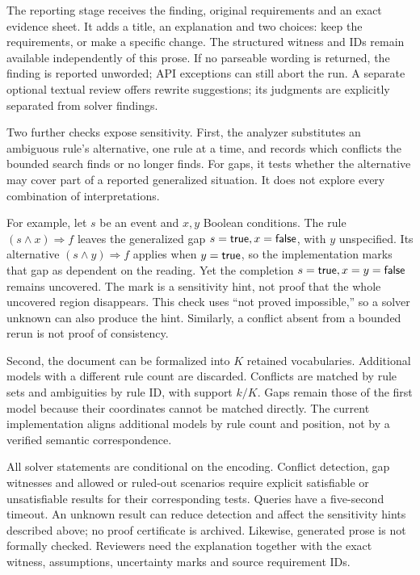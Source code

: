 The reporting stage receives the finding, original requirements and an
exact evidence sheet. It adds a title, an explanation and two choices:
keep the requirements, or make a specific change. The structured witness
and IDs remain available independently of this prose. If no parseable wording
is returned, the finding is reported unworded; API exceptions can still abort
the run. A separate optional textual review offers
rewrite suggestions; its judgments are explicitly separated from solver
findings.

Two further checks expose sensitivity. First, the analyzer substitutes an
ambiguous rule's alternative, one rule at a time, and records which
conflicts the bounded search finds or no longer finds. For gaps, it tests
whether the alternative may cover part of a reported generalized situation.
It does not explore every combination of interpretations.

For example, let $s$ be an event and $x,y$ Boolean conditions. The rule
$(s\land x)\Rightarrow f$ leaves the generalized gap
$s=\mathsf{true},x=\mathsf{false}$, with $y$ unspecified. Its alternative
$(s\land y)\Rightarrow f$ applies when $y=\mathsf{true}$, so the implementation
marks that gap as dependent on the reading. Yet the completion
$s=\mathsf{true},x=y=\mathsf{false}$ remains uncovered. The mark is a sensitivity hint,
not proof that the whole uncovered region disappears. This check uses
``not proved impossible,'' so a solver unknown can also produce the hint.
Similarly, a conflict absent from a bounded rerun is not proof of consistency.

Second, the document can be formalized into $K$ retained vocabularies.
Additional models with a different rule count are discarded. Conflicts are matched by rule sets and
ambiguities by rule ID, with support $k/K$. Gaps remain those of the first
model because their coordinates cannot be matched directly. The current
implementation aligns additional models by rule count and position, not
by a verified semantic correspondence.

All solver statements are conditional on the encoding. Conflict detection,
gap witnesses and allowed or ruled-out scenarios require explicit
satisfiable or unsatisfiable results for their corresponding tests.
Queries have a five-second timeout. An unknown result can reduce detection
and affect the sensitivity hints described above; no proof certificate is
archived. Likewise, generated prose
is not formally checked. Reviewers need the explanation together with the
exact witness, assumptions, uncertainty marks and source requirement IDs.

